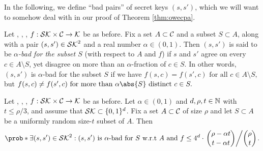 In the following, we define ``bad pairs'' of secret keys \((s,s')\),
which we will want to somehow deal with in our proof of Theorem \ref{thm:owecpa}.

\begin{definition}\label{def:bad}
  Let \setSK, \setC, \keyspace, \(f : \mathcal{SK} \times \mathcal{C} \to \mathcal{K}\) be as before.
  Fix a set \(A \subset \mathcal{C}\) and a subset \(S \subset A\),
  along with a pair \((s,s') \in \mathcal{SK}^{2}\) and a real number \(\alpha \in (0,1)\).
  Then \((s,s')\) is said to be \emph{\(\alpha\)-bad for the subset \(S\)} (with respect to \(A\) and \(f\)) if
  \(s\) and \(s'\) agree on every \(c \in A \setminus S\), yet disagree on more than an \(\alpha\)-fraction of \(c \in S\).
  In other words, \((s,s')\) is \(\alpha\)-bad for the subset \(S\) if we have
  \(
    f(s,c) = f(s',c) \text{ for all } c \in A \setminus S,
  \)
  but
  \(
    f(s,c) \ne f(s',c) \text{ for more than } \alpha \abs{S} \text{ distinct } c \in S.
  \)
\end{definition}


\begin{lemma}\label{lemma:equiv}
  Let \setSK, \setC, \keyspace, \(f : \mathcal{SK} \times \mathcal{C} \to \mathcal{K}\) be as before.
  Let \(\alpha \in (0,1)\) and \(d,\rho,t \in \mathbb{N}\) with \(t \le \rho/3\),
  and assume that \(\mathcal{SK} \subset \{0,1\}^{d}\).
  Fix a set \(A \subset \mathcal{C}\) of size \(\rho\)
  and let \(S \subset A\) be a uniformly random size-\(t\) subset of \(A\).
  Then
  \begin{align}\label{ineq:equiv}
    \prob*{\exists (s,s') \in \setSK^{2} : (s,s') \text{ is \(\alpha\)-bad for } S \text{ w.r.t \(A\) and \(f\)}}
    \le 4^{d} \cdot \left. \binom{\rho - \alpha t}{t - \alpha t} \middle/ \binom{\rho}{t} \right..
  \end{align}
\end{lemma}

